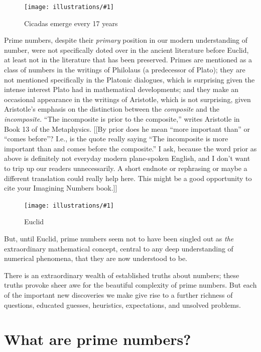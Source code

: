 \documentclass[11pt]{article}
\newcommand{\ill}[3]{ 
   \begin{figure}[H]
   \begin{center}
   \texttt{[image: illustrations/\#1]}
   \caption{#3}
   \end{center}
    \end{figure}
}
\theoremstyle{plain}
\theoremstyle{definition}
\numberwithin{equation}{section}
\numberwithin{figure}{section}
\numberwithin{table}{section}
\begin{document}
\ill{cicada}{.3}{Cicadas emerge every 17 years}

\bigskip


Prime numbers, despite their {\em primary} position in our modern
understanding of number, were not specifically doted over in the
ancient literature before Euclid, at least not in the literature that
has been preserved. Primes are mentioned as a class of numbers in the
writings of Philolaus (a predecessor of Plato); they are not mentioned
specifically in the Platonic dialogues, which is surprising 
given the intense interest Plato had in mathematical developments; and
they make an occasional appearance in the writings of Aristotle, which
is not surprising, given Aristotle's emphasis on the distinction
between the {\em composite} and the {\em incomposite}. ``The
incomposite is prior to the composite,'' writes Aristotle in Book 13 of
the Metaphysics.
[[By prior does he mean ``more important than'' or ``comes before''?  I.e., is the quote
really saying ``The incomposite is more important than and comes before the composite.''
I ask, because the word prior as above is definitely not everyday modern
plane-spoken English, and I don't want to trip up our readers unnecessarily.  A
short endnote or rephrasing or maybe a different translation could really help here.
This might be a good opportunity to cite your Imagining Numbers book.]]
           
\ill{euclid}{.3}{Euclid}           

But, until Euclid, prime numbers seem not to have been singled out as
{\em the} extraordinary mathematical concept, central to any deep
understanding of numerical phenomena, that they are now understood to
be.
       
\bigskip


There is an extraordinary wealth of established truths about numbers;
these truths provoke sheer awe for the beautiful complexity of prime
numbers. But each of the important new discoveries we make give rise
to a further richness of questions, educated guesses, heuristics,
expectations, and unsolved problems.
            
            \bigskip
            
\section{What are prime numbers?}
            
\end{document}
